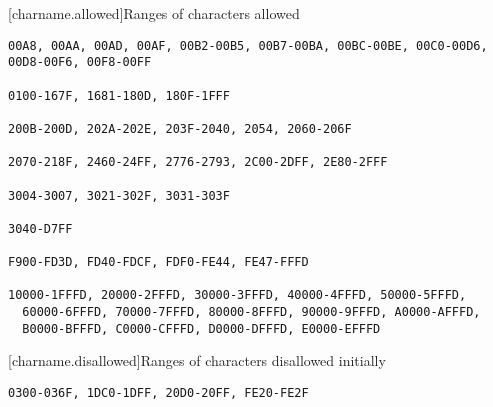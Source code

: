 
[charname.allowed]{Ranges of characters allowed}

\begin{lstlisting}
00A8, 00AA, 00AD, 00AF, 00B2-00B5, 00B7-00BA, 00BC-00BE, 00C0-00D6, 00D8-00F6, 00F8-00FF

0100-167F, 1681-180D, 180F-1FFF

200B-200D, 202A-202E, 203F-2040, 2054, 2060-206F

2070-218F, 2460-24FF, 2776-2793, 2C00-2DFF, 2E80-2FFF

3004-3007, 3021-302F, 3031-303F

3040-D7FF

F900-FD3D, FD40-FDCF, FDF0-FE44, FE47-FFFD

10000-1FFFD, 20000-2FFFD, 30000-3FFFD, 40000-4FFFD, 50000-5FFFD,
  60000-6FFFD, 70000-7FFFD, 80000-8FFFD, 90000-9FFFD, A0000-AFFFD,
  B0000-BFFFD, C0000-CFFFD, D0000-DFFFD, E0000-EFFFD
\end{lstlisting}

[charname.disallowed]{Ranges of characters disallowed initially}

\begin{lstlisting}
0300-036F, 1DC0-1DFF, 20D0-20FF, FE20-FE2F
\end{lstlisting}
